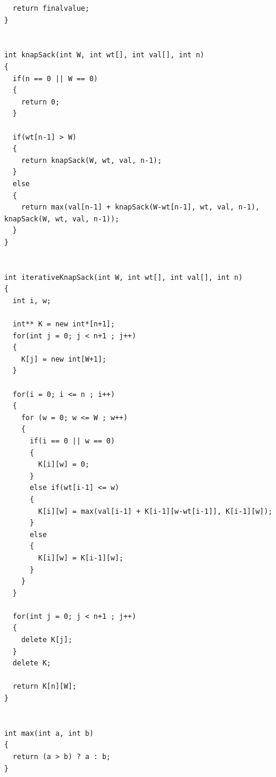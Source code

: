 \documentclass[a4paper]{article}
\begin{document}
\begin{verbatim}
  return finalvalue;
}


int knapSack(int W, int wt[], int val[], int n)
{
  if(n == 0 || W == 0)
  {
    return 0;
  }

  if(wt[n-1] > W)
  {
    return knapSack(W, wt, val, n-1);
  }
  else
  {
    return max(val[n-1] + knapSack(W-wt[n-1], wt, val, n-1), knapSack(W, wt, val, n-1));
  }
}


int iterativeKnapSack(int W, int wt[], int val[], int n)
{
  int i, w;

  int** K = new int*[n+1];
  for(int j = 0; j < n+1 ; j++)
  {
    K[j] = new int[W+1];
  }

  for(i = 0; i <= n ; i++)
  {
    for (w = 0; w <= W ; w++)
    {
      if(i == 0 || w == 0)
      {
        K[i][w] = 0;
      }
      else if(wt[i-1] <= w)
      {
        K[i][w] = max(val[i-1] + K[i-1][w-wt[i-1]], K[i-1][w]);
      }
      else
      {
        K[i][w] = K[i-1][w];
      }
    }
  }

  for(int j = 0; j < n+1 ; j++)
  {
    delete K[j];
  }
  delete K;

  return K[n][W];
}


int max(int a, int b)
{
  return (a > b) ? a : b;
}

    \end{verbatim}
\end{document}
